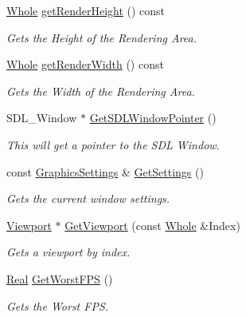 \begin{DoxyCompactItemize}
\hyperlink{namespaceMezzanine_adcbb6ce6d1eb4379d109e51171e2e493}{Whole} \hyperlink{classMezzanine_1_1GameWindow_a4df354cf07173e21e9c2802882424c4d}{getRenderHeight} () const 
\begin{DoxyCompactList}\small\item\em Gets the Height of the Rendering Area. \item\end{DoxyCompactList}\item 
\hyperlink{namespaceMezzanine_adcbb6ce6d1eb4379d109e51171e2e493}{Whole} \hyperlink{classMezzanine_1_1GameWindow_ae25f20216007a5aff15115d908e8e711}{getRenderWidth} () const 
\begin{DoxyCompactList}\small\item\em Gets the Width of the Rendering Area. \item\end{DoxyCompactList}\item 
SDL\_\-Window $\ast$ \hyperlink{classMezzanine_1_1GameWindow_a9d0fdf6e26f5ef499707fb590e9f3da0}{GetSDLWindowPointer} ()
\begin{DoxyCompactList}\small\item\em This will get a pointer to the SDL Window. \item\end{DoxyCompactList}\item 
const \hyperlink{structMezzanine_1_1GraphicsSettings}{GraphicsSettings} \& \hyperlink{classMezzanine_1_1GameWindow_af16dfa28de1dfadc0c921e05a0ccd9e7}{GetSettings} ()
\begin{DoxyCompactList}\small\item\em Gets the current window settings. \item\end{DoxyCompactList}\item 
\hyperlink{classMezzanine_1_1Viewport}{Viewport} $\ast$ \hyperlink{classMezzanine_1_1GameWindow_ac3ae0f2e4cee0238ae4c158adea1422e}{GetViewport} (const \hyperlink{namespaceMezzanine_adcbb6ce6d1eb4379d109e51171e2e493}{Whole} \&Index)
\begin{DoxyCompactList}\small\item\em Gets a viewport by index. \item\end{DoxyCompactList}\item 
\hyperlink{namespaceMezzanine_a726731b1a7df72bf3583e4a97282c6f6}{Real} \hyperlink{classMezzanine_1_1GameWindow_afd5af20c62dfc0e9ab52fe689f5e8bc8}{GetWorstFPS} ()
\begin{DoxyCompactList}\small\item\em Gets the Worst FPS. \item\end{DoxyCompactList}\item 

\end{DoxyCompactItemize}
